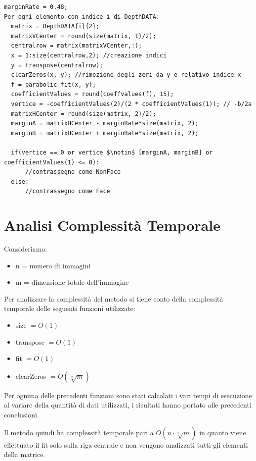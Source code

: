 \documentclass[
  italian,
]{article}
\providecommand{\tightlist}{%
  \setlength{\itemsep}{0pt}\setlength{\parskip}{0pt}}
\begin{document}
\begin{lstlisting}[basicstyle=\small, mathescape=true]
marginRate = 0.48;
Per ogni elemento con indice i di DepthDATA:
  matrix = DepthDATA{i}{2}; 
  matrixVCenter = round(size(matrix, 1)/2);
  centralrow = matrix(matrixVCenter,:);
  x = 1:size(centralrow,2); //creazione indici
  y = transpose(centralrow);
  clearZeros(x, y); //rimozione degli zeri da y e relativo indice x
  f = parabolic_fit(x, y);
  coefficientValues = round(coeffvalues(f), 15);
  vertice = -coefficientValues(2)/(2 * coefficientValues(1)); // -b/2a
  matrixHCenter = round(size(matrix, 2)/2);
  marginA = matrixHCenter - marginRate*size(matrix, 2);
  marginB = matrixHCenter + marginRate*size(matrix, 2);
  
  if(vertice == 0 or vertice $\notin$ [marginA, marginB] or coefficientValues(1) <= 0):
      //contrassegno come NonFace
  else:
      //contrassegno come Face
\end{lstlisting}


\hypertarget{analisi-complessituxe0-temporale}{%
\section{Analisi Complessità
Temporale}\label{analisi-complessituxe0-temporale}}

Consideriamo:

\begin{itemize}
\tightlist
\item
  n = numero di immagini
\item
  m = dimensione totale dell'immagine
\end{itemize}

Per analizzare la complessità del metodo si tiene conto della
complessità temporale delle seguenti funzioni utilizzate:

\begin{itemize}
\tightlist
\item
  size \(= O(1)\)
\item
  transpose \(= O(1)\)
\item
  fit \(= O(1)\)
\item
  clearZeros \(= O(\sqrt[2]{m}) \)
\end{itemize}

Per ognuna delle precedenti funzioni sono stati calcolati i vari tempi
di esecuzione al variare della quantità di dati utilizzati, i risultati
hanno portato alle precedenti conclusioni.

Il metodo quindi ha complessità temporale pari a \(O(n \cdot \sqrt[2]{m})\) in
quanto viene effettuato il fit solo sulla riga centrale e non vengono analizzati tutti gli elementi della matrice.
\end{document}
